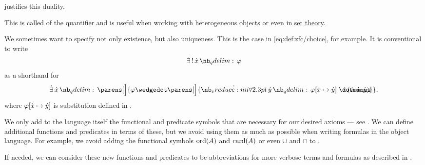 \begin{remark}
\begin{thmenum}
     justifies this duality.

    This is called  of the quantifier and is useful when working with heterogeneous objects or even in \hyperref[sec:set_theory]{set theory}.

     We sometimes want to specify not only existence, but also uniqueness. This is the case in \eqref{eq:def:zfc/choice}, for example. It is conventional to write
    \begin{equation*}
      \qExists \synx \varphi
    \end{equation*}
    as a shorthand for
    \begin{equation*}
      \qexists \synx \parens[\Big]{ \varphi \synwedge \parens[\Big]{ \qforall \syny \varphi[\synx \mapsto \syny] \synimplies (\synx \syneq \syny) } },
    \end{equation*}
    where \( \varphi[{\dot{x}} \mapsto {\dot{y}}] \) is substitution defined in .

     We only add to the language itself the functional and predicate symbols that are necessary for our desired axioms --- see . We can define additional functions and predicates in terms of these, but we avoid using them as much as possible when writing formulas in the object language. For example, we avoid adding the functional symbols \hyperref[thm:well_ordered_order_type_existence]{\( \operatorname{ord}(A) \)} and \hyperref[def:cardinal]{\( \operatorname{card}(A) \)} or even \hyperref[def:basic_set_operations/union]{\( \cup \)} and \hyperref[def:basic_set_operations/intersection]{\( \cap \)} to \hyperref[def:zfc]{}.

    If needed, we can consider these new functions and predicates to be abbreviations for more verbose terms and formulas as described in .
  \end{thmenum}
\end{remark}

